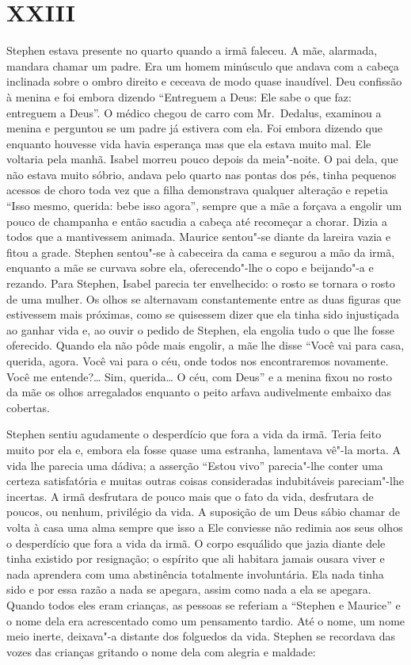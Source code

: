 \section*{XXIII}

Stephen estava presente no quarto quando a irmã faleceu.  A mãe, alarmada,
mandara chamar um padre.  Era um homem minúsculo que andava com a cabeça
inclinada sobre o ombro direito e ceceava de modo quase inaudível.  Deu
confissão à menina e foi embora dizendo “Entreguem a Deus: Ele sabe o que faz:
entreguem a Deus”.  O médico chegou de carro com Mr.~Dedalus, examinou a
menina e perguntou se um padre já estivera com ela.  Foi embora dizendo que
enquanto houvesse vida havia esperança mas que ela estava muito mal.  Ele
voltaria pela manhã.  Isabel morreu pouco depois da meia"-noite.  O pai dela,
que não estava muito sóbrio, andava pelo quarto nas pontas dos pés, tinha
pequenos acessos de choro toda vez que a filha demonstrava qualquer alteração e
repetia “Isso mesmo, querida: bebe isso agora”, sempre que a mãe a forçava a
engolir um pouco de champanha e então sacudia a cabeça até recomeçar a chorar.
Dizia a todos que a mantivessem animada.  Maurice sentou"-se diante da lareira
vazia e fitou a grade.  Stephen sentou"-se à cabeceira da cama e segurou a mão
da irmã, enquanto a mãe se curvava sobre ela, oferecendo"-lhe o copo e
beijando"-a e rezando.  Para Stephen, Isabel parecia ter envelhecido: o rosto se
tornara o rosto de uma mulher.  Os olhos se alternavam constantemente entre as
duas figuras que estivessem mais próximas, como se quisessem dizer que ela
tinha sido injustiçada ao ganhar vida e, ao ouvir o pedido de Stephen, ela
engolia tudo o que lhe fosse oferecido.  Quando ela não pôde mais engolir, a
mãe lhe disse “Você vai para casa, querida, agora.  Você vai para o céu, onde
todos nos encontraremos novamente.  Você me entende?\ldots{}  Sim, querida\ldots{}  O
céu, com Deus” e a menina fixou no rosto da mãe os olhos arregalados enquanto o
peito arfava audivelmente embaixo das cobertas.

Stephen sentiu agudamente o desperdício que fora a vida da irmã.  Teria feito
muito por ela e, embora ela fosse quase uma estranha, lamentava vê"-la morta.  A
vida lhe parecia uma dádiva; a asserção “Estou vivo” parecia"-lhe conter uma
certeza satisfatória e muitas outras coisas consideradas indubitáveis
pareciam"-lhe incertas.  A irmã desfrutara de pouco mais que o fato da vida,
desfrutara de poucos, ou nenhum, privilégio da vida.  A suposição de um Deus
sábio chamar de volta à casa uma alma sempre que isso a Ele conviesse não
redimia aos seus olhos o desperdício que fora a vida da irmã.  O corpo
esquálido que jazia diante dele tinha existido por resignação; o espírito que
ali habitara jamais ousara viver e nada aprendera com uma abstinência
totalmente involuntária.  Ela nada tinha sido e por essa razão a nada se
apegara, assim como nada a ela se apegara.  Quando todos eles eram crianças, as
pessoas se referiam a “Stephen e Maurice” e o nome dela era acrescentado como
um pensamento tardio.  Até o nome, um nome meio inerte, deixava"-a distante dos
folguedos da vida.  Stephen se recordava das vozes das crianças gritando o nome
dela com alegria e maldade:

